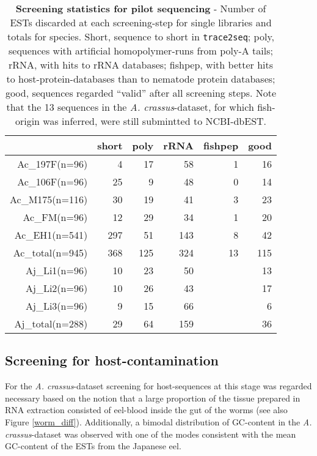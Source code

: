 \small\begin{table}[ht]
\begin{center}
\begin{tabular}{rrrrrr}
  \hline
 & short & poly & rRNA & fishpep & good \\ 
  \hline
Ac\_197F(n=96) &   4 &  17 &  58 &   1 &  16 \\ 
  Ac\_106F(n=96) &  25 &   9 &  48 &   0 &  14 \\ 
  Ac\_M175(n=116) &  30 &  19 &  41 &   3 &  23 \\ 
  Ac\_FM(n=96) &  12 &  29 &  34 &   1 &  20 \\ 
  Ac\_EH1(n=541) & 297 &  51 & 143 &   8 &  42 \\ 
  Ac\_total(n=945) & 368 & 125 & 324 &  13 & 115 \\ 
  Aj\_Li1(n=96) &  10 &  23 &  50 &  &  13 \\ 
  Aj\_Li2(n=96) &  10 &  26 &  43 &  &  17 \\ 
  Aj\_Li3(n=96) &   9 &  15 &  66 &  &   6 \\ 
  Aj\_total(n=288) &  29 &  64 & 159 &  &  36 \\ 
   \hline
\end{tabular}
\caption[Screening statistics for pilot sequencing] {\textbf{Screening
    statistics for pilot sequencing} - Number of ESTs discarded at
  each screening-step for single libraries and totals for
  species. Short, sequence to short in \texttt{trace2seq}; poly,
  sequences with artificial homopolymer-runs from poly-A tails; rRNA,
  with hits to rRNA databases; fishpep, with better hits to
  host-protein-databases than to nematode protein databases; good,
  sequences regarded ``valid'' after all screening steps. Note that
  the 13 sequences in the \textit{A. crassus}-dataset, for which
  fish-origin was inferred, were still submintted to NCBI-dbEST.}

\label{tab:num}
\end{center}
\end{table}
\normalsize

\subsection{Screening for host-contamination}
\label{host-pil}

For the \textit{A. crassus}-dataset screening for host-sequences at
this stage was regarded necessary based on the notion that a large
proportion of the tissue prepared in RNA extraction consisted of
eel-blood inside the gut of the worms (see also Figure
\ref{worm_diff}). Additionally, a bimodal distribution of GC-content
in the \textit{A. crassus}-dataset was observed with one of the modes
consistent with the mean GC-content of the ESTs from the Japanese eel.

